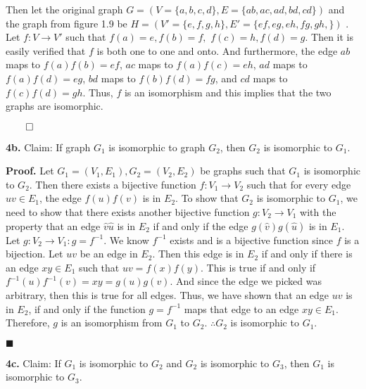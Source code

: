 \documentclass{article}
\begin{document}
Then let the original graph \(G= (V=\{a,b,c,d\}, E=\{ab,ac,ad,bd,cd\} ) \) and the graph from figure 1.9 be \(H = (V'=\{e,f,g,h\}, E'=\{ef,eg,eh,fg,gh,\} )\) . Let \(f:V \rightarrow V' \) such that \(f(a)=e, f(b)=f,\)
\( f(c)=h, f(d)=g\). Then it is easily verified that \(f\) is both one to one and onto. And furthermore, the edge \(ab\) maps to \(f(a)f(b)=ef \), \(ac\) maps to \(f(a)f(c)=eh \), \(ad\) maps to \(f(a)f(d)=eg \), \(bd\) maps to \(f(b)f(d)=fg \), and \(cd\) maps to \(f(c)f(d)=gh \). Thus, \(f\) is an isomorphism and this implies that the two graphs are isomorphic. 
\begin{flushright}
\(\qed\)
\end{flushright}



\vspace{3mm}

\textbf{4b.} Claim: If graph \(G_1\) is isomorphic to graph \(G_2\), then \(G_2\) is isomorphic to \(G_1\). 

\vspace{3mm}  

\textbf{Proof.} Let \(G_1=(V_1,E_1), G_2=(V_2,E_2)\) be graphs such that \(G_1\) is isomorphic to \(G_2\). Then there exists a bijective function \(f:V_1 \rightarrow V_2\) such that for every edge \( uv \in E_1\), the edge \(f(u)f(v)\) is in \( E_2\). To show that \(G_2\) is isomorphic to \(G_1\), we need to show that there exists another bijective function \(g:V_2 \rightarrow V_1\) with the property that an edge \(\hat v \hat u \) is in \(E_2\) if and only if the edge \(g(\hat v)g(\hat u)\) is in \(E_1\). Let \(g:V_2 \rightarrow V_1 : g = f^{-1}\). We know \(f^{-1}\) exists and is a bijective function since \(f\) is a bijection. Let \(uv\) be an edge in \(E_2\). Then this edge is in \(E_2\) if and only if there is an edge \(xy \in E_1\) such that \(uv=f(x)f(y)\). This is true if and only if \( f^{-1}(u)f^{-1}(v)=xy = g(u)g(v)\). And since the edge we picked was arbitrary, then this is true for all edges. Thus, we have shown that an edge \(uv\) is in \( E_2\), if and only if the function \(g=f^{-1}\) maps that edge to an edge \(xy \in E_1\). Therefore, \(g\) is an isomorphism from \(G_1\) to \(G_2\). \(\therefore G_2 \) is isomorphic to \(G_1\). 

\begin{flushright}
\( \blacksquare \) 
\end{flushright}

\newpage

\textbf{4c.} Claim: If \(G_1\) is isomorphic to \(G_2\) and \(G_2\) is isomorphic to \(G_3\), then \(G_1\) is isomorphic to \(G_3\). 
\end{document}
